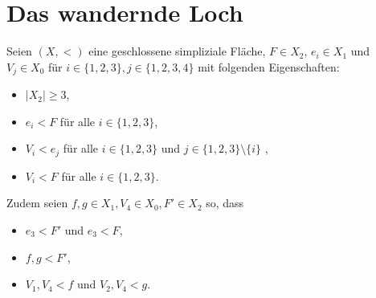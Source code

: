 \documentclass[12pt,titlepage]{article}
\begin{document}
\section*{Das wandernde Loch}
 Seien $(X,<)$ eine geschlossene simpliziale Fläche, $F \in X_{2}$, $e_{i} \in X_{1}$ und $V_{j} \in X_{0}$ für $i \in \{1,2,3\},j \in \{1,2,3,4\}$ mit folgenden Eigenschaften:
 \begin{itemize}
 \item $\vert X_{2}\vert \geq 3$,
 \item $e_{i} < F$ für alle $i \in \{1,2,3\}$,
 \item $V_{i}<e_{j}$ für alle $i \in \{1,2,3\}$ und $j \in \{1,2,3\} \setminus\{i\}$ ,
 \item $V_{i} < F$ für alle $i \in \{1,2,3\}$.
\end{itemize}  
Zudem seien $f,g \in X_1,V_4 \in X_0,F' \in X_2$ so, dass
\begin{itemize}
\item $e_3<F'$ und $e_3<F$,
\item $f,g <F'$, 
\item $V_1,V_4<f$ und $V_2,V_4<g$.
\end{itemize}
\end{document}

